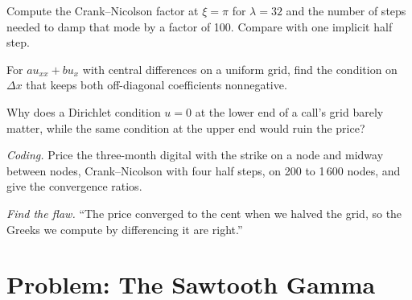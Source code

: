\begin{exercise}[$\star\star$]\label{exo:qm:finite-difference-methods:4}
Compute the Crank--Nicolson factor at $\xi = \pi$ for $\lambda = 32$ and the number of steps needed to damp that mode by a factor of 100. Compare with one implicit half step.
\end{exercise}

\begin{exercise}[$\star\star$]\label{exo:qm:finite-difference-methods:5}
For $au_{xx} + bu_x$ with central differences on a uniform grid, find the condition on $\Delta x$ that keeps both off-diagonal coefficients nonnegative.
\end{exercise}

\begin{exercise}[$\star\star$]\label{exo:qm:finite-difference-methods:6}
Why does a Dirichlet condition $u = 0$ at the lower end of a call's grid barely matter, while the same condition at the upper end would ruin the price?
\end{exercise}

\begin{exercise}[$\star\star\star$]\label{exo:qm:finite-difference-methods:7}
\emph{Coding.} Price the three-month digital with the strike on a node and midway between nodes, Crank--Nicolson with four half steps, on 200 to 1\,600 nodes, and give the convergence ratios.
\end{exercise}

\begin{exercise}[$\star\star\star$]\label{exo:qm:finite-difference-methods:8}
\emph{Find the flaw.} ``The price converged to the cent when we halved the grid, so the Greeks we compute by differencing it are right.''
\end{exercise}

\section{Problem: The Sawtooth Gamma}

